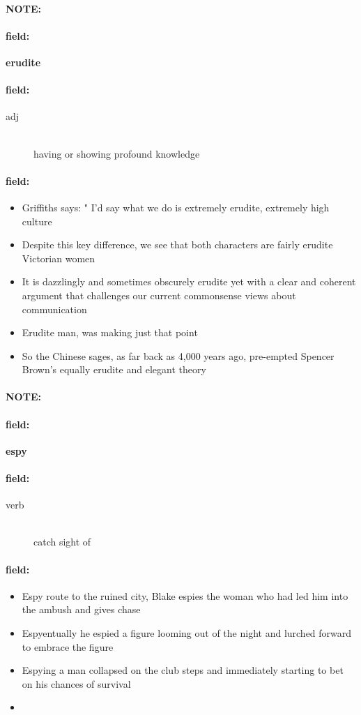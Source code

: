 \documentclass[12pt]{article}
\newenvironment{note}{\paragraph{NOTE:}}{}
\newenvironment{field}{\paragraph{field:}}{}
\begin{document}
\begin{note}
\begin{field}
\textbf{\large erudite}
\end{field}


\begin{field}
\begin{description}
\item[adj] \hfill \\ 
having or showing profound knowledge

\end{description}
\end{field}

\begin{field}
\begin{itemize}
\item Griffiths says: " I'd say what we do is extremely erudite, extremely high culture
\item Despite this key difference, we see that both characters are fairly erudite Victorian women
\item It is dazzlingly and sometimes obscurely erudite yet with a clear and coherent argument that challenges our current commonsense views about communication
\item Erudite man, was making just that point
\item So the Chinese sages, as far back as 4,000 years ago, pre-empted Spencer Brown's equally erudite and elegant theory
\end{itemize}
\end{field}
\end{note}
\begin{note}
\begin{field}
\textbf{\large espy}
\end{field}


\begin{field}
\begin{description}
\item[verb] \hfill \\ 
catch sight of

\end{description}
\end{field}

\begin{field}
\begin{itemize}
\item Espy route to the ruined city, Blake espies the woman who had led him into the ambush and gives chase
\item Espyentually he espied a figure looming out of the night and lurched forward to embrace the figure
\item Espying a man collapsed on the club steps and immediately starting to bet on his chances of survival
\item 
\end{itemize}
\end{field}
\end{note}
\end{document}

